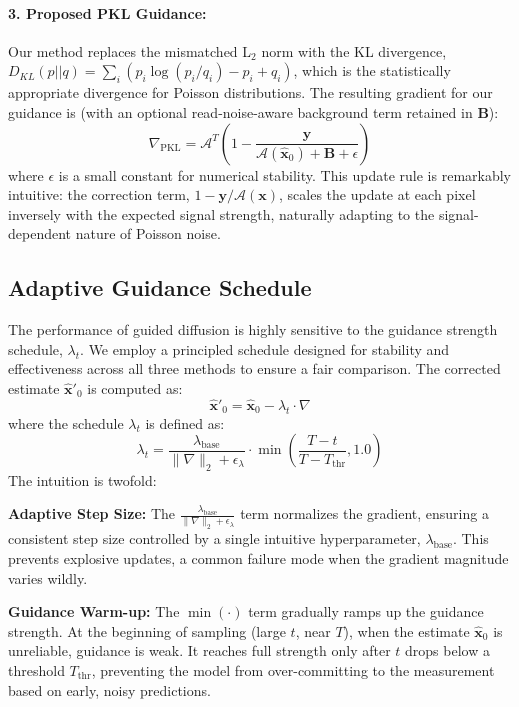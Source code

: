 \documentclass{article}
\begin{document}
\paragraph{3. Proposed PKL Guidance:} Our method replaces the mismatched L$_2$ norm with the KL divergence, $D_{KL}(p||q) = \sum_i (p_i \log(p_i/q_i) - p_i + q_i)$, which is the statistically appropriate divergence for Poisson distributions. The resulting gradient for our guidance is (with an optional read-noise-aware background term retained in $\mathbf{B}$):
\begin{equation}
\nabla_{\text{PKL}} = \mathcal{A}^T \left( 1 - \frac{\mathbf{y}}{\mathcal{A}(\mathbf{\hat{x}}_0) + \mathbf{B} + \epsilon} \right)
\end{equation}
where $\epsilon$ is a small constant for numerical stability. This update rule is remarkably intuitive: the correction term, $1 - \mathbf{y}/\mathcal{A}(\mathbf{x})$, scales the update at each pixel inversely with the expected signal strength, naturally adapting to the signal-dependent nature of Poisson noise.

\subsection{Adaptive Guidance Schedule}
The performance of guided diffusion is highly sensitive to the guidance strength schedule, $\lambda_t$. We employ a principled schedule designed for stability and effectiveness across all three methods to ensure a fair comparison. The corrected estimate $\mathbf{\hat{x}}'_0$ is computed as:
\begin{equation}
\mathbf{\hat{x}}'_0 = \mathbf{\hat{x}}_0 - \lambda_t \cdot \nabla
\end{equation}
where the schedule $\lambda_t$ is defined as:
\begin{equation}
\lambda_t = \frac{\lambda_{\text{base}}}{\|\nabla\|_2 + \epsilon_\lambda} \cdot \min\left(\frac{T-t}{T-T_{\text{thr}}}, 1.0\right)
\end{equation}
The intuition is twofold:

\textbf{Adaptive Step Size:} The $\frac{\lambda_{\text{base}}}{\|\nabla\|_2 + \epsilon_\lambda}$ term normalizes the gradient, ensuring a consistent step size controlled by a single intuitive hyperparameter, $\lambda_{\text{base}}$. This prevents explosive updates, a common failure mode when the gradient magnitude varies wildly.

\textbf{Guidance Warm-up:} The $\min(\cdot)$ term gradually ramps up the guidance strength. At the beginning of sampling (large $t$, near $T$), when the estimate $\mathbf{\hat{x}}_0$ is unreliable, guidance is weak. It reaches full strength only after $t$ drops below a threshold $T_{\text{thr}}$, preventing the model from over-committing to the measurement based on early, noisy predictions.
\end{document}
